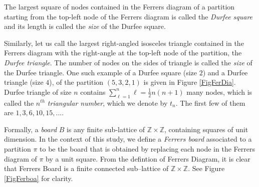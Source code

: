\documentclass[12pt,reqno]{amsart}
\numberwithin{equation}{section}
\theoremstyle{plain}
\begin{document}
	The largest square of nodes contained in the Ferrers diagram of a partition starting from the top-left node of the Ferrers diagram is called the \emph{Durfee square} and its length is called the \emph{size} of the Durfee square. 
	
	Similarly, let us call the largest right-angled isosceles triangle contained in the Ferrers diagram with the right-angle at the top-left node of the partition, the \emph{Durfee triangle}. The number of nodes on the sides of triangle is called the \emph{size} of the Durfee triangle. One such example of a Durfee square (size $2$) and a Durfee triangle (size $4$), of the partition $(5,3,2,1)$ is given in Figure \ref{FigFerDia}. Durfee triangle of size $n$ contains $\sum_{\ell=1}^{n} \ell = \frac{1}{2}n(n+1)$ many nodes, which is called the $n^{th}$ \emph{triangular number}, which we denote by $t_n$. The first few of them are $1,3,6,10,15, ....$
	
	Formally, a \emph{board} $B$ is any finite sub-lattice of $\mathbb{Z}\times\mathbb{Z}$, containing squares of unit dimension. In the context of this study, we define a \emph{Ferrers board} associated to a partition $\pi$ to be the board that is obtained by replacing each node in the Ferrers diagram of $\pi$ by a unit square. From the defintion of Ferrers Diagram, it is clear that Ferrers Board is a finite connected sub--lattice of $\mathbb{Z}\times\mathbb{Z}$. See Figure \ref{FigFerboa} for clarity.
	
\end{document}
